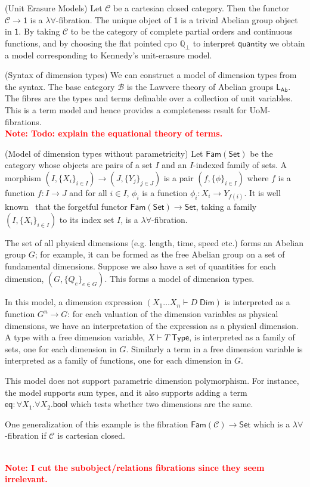 \documentclass[a4paper,UKenglish]{lipics}
\newcommand\note[1]{{ \bf \textcolor{red} {\vspace{2mm}\; \\ Note: #1\\}}}
\newcommand{\ra}{\rightarrow}
\newcommand{\msf}[1]{\mathsf{#1}} %
\newcommand{\Set}{\msf{Set}}
\newcommand{\Fam}[1]{\msf{Fam}(#1)}
\newcommand{\LAb}{\msf{L}_{\msf{Ab}}}
\newcommand{\terminal}{\msf{1}}
\newcommand{\B}{\mathcal{B}}
\newcommand{\C}{\mathcal{C}}
\newcommand{\bbQ}{\mathbb{Q}}
\newcommand{\num}{\msf{quantity}}
\newcommand{\bool}{\msf{bool}}
\newcommand{\Tj}[2]{#1 \vdash #2 \; \msf{ Type}}
\newcommand{\Dj}[2]{#1 \vdash #2 \; \msf{ Dim}}
\newcommand{\Dim}{D}
\newcommand{\Dvar}{X}
\begin{document}
\begin{example}(Unit Erasure Models)
\label{ex:UnitErasure}
Let $\C$ be a cartesian closed category. Then the functor $\C \ra
\terminal$ is a $\lambda\forall$-fibration.
The unique object of $\terminal$
is a trivial Abelian group object in
$\terminal$. By taking $\C$ to be the category of complete partial
orders and continuous functions, and by choosing the flat pointed cpo
$\bbQ_{\bot}$ to interpret $\num$ we obtain a model
corresponding to Kennedy's unit-erasure model.
\end{example}


\begin{example}(Syntax of dimension types)
We can construct a model of dimension types from the syntax.
The base category $\B$ is the Lawvere theory of Abelian groups $\LAb$.
The
fibres are the types and terms definable over a collection of unit
variables. This is a term model and hence provides a completeness
result for UoM-fibrations.
\note{Todo: explain the equational theory of terms.}\end{example}


\begin{example}(Model of dimension types without parametricity)
Let $\Fam\Set$ be the category whose objects
are pairs of a set $I$ and an $I$-indexed family of sets.
A morphism $(I,\{X_i\}_{i\in I})\to (J,\{Y_j\}_{j\in J})$
is a pair $(f,\{\phi\}_{i\in I})$ where $f$ is a function $f:I\to J$
and for all $i\in I$, $\phi_i$ is a function $\phi_i:X_i\to Y_{f(i)}$.
It is well known~\cite{} that the forgetful functor $\Fam\Set\to \Set$, taking a family
$(I,\{X_i\}_{i\in I})$ to its index set $I$, is a $\lambda\forall$-fibration.

The set of all physical dimensions (e.g. length, time, speed etc.)
forms an Abelian group $G$; for example, it can be formed as the free Abelian group on a set
of fundamental dimensions.
Suppose we also have a set of quantities for each dimension, $(G,\{Q_e\}_{e\in G})$.
This forms a model of dimension types.

In this model, a dimension expression
$(\Dj{\Dvar_1\dots \Dvar_n} \Dim)$ is interpreted
as a function $G^n\to G$: for each valuation
of the dimension variables as physical dimensions,
we have an interpretation of the expression as a physical dimension.
A type with a free dimension variable, $\Tj \Dvar T$,
is interpreted as a family of sets, one for each dimension in $G$.
Similarly a term in a free dimension variable is interpreted as a family of functions,
one for each dimension in $G$.

This model does not support parametric dimension polymorphism.
For instance, the model supports sum types,
and it also supports adding a term $\mathsf{eq}:\forall \Dvar_1.\forall \Dvar_2.\bool$
which tests whether two dimensions are the same.

One generalization of this example is the fibration $\Fam{\C}\to\Set$
which is a $\lambda\forall$-fibration if $\C$ is cartesian closed.
\end{example}
\note{I cut the subobject/relations fibrations since they seem irrelevant.}
\end{document}

